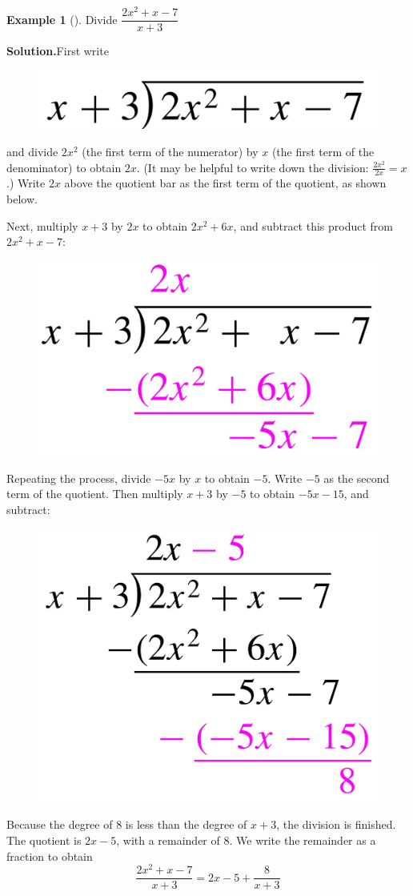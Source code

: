 \documentclass[10pt,]{book}
\theoremstyle{plain}
\theoremstyle{definition}
\theoremstyle{definition}
\newtheorem{example}[theorem]{Example}
\theoremstyle{definition}
\numberwithin{equation}{part}
\begin{document}
\begin{example}[]\label{example-long-division}
Divide \(\dfrac{2x^2+x-7}{x+3}\)%
\par\medskip\noindent%
\textbf{Solution.}\quad First write \leavevmode%
\begin{figure}
\centering
\includegraphics[width=0.35\linewidth]{images/fig-long-division.jpg}
\end{figure}
 and divide \(2x^2\) (the first term of the numerator) by \(x\) (the first term of the denominator) to obtain \(2x\). (It may be helpful to write down the division: \(\frac{2x^2}{2x}=x\).) Write \(2x\) above the quotient bar as the first term of the quotient, as shown below.%
\par
Next, multiply \(x+3\) by \(2x\) to obtain \(2x^2 + 6x\), and subtract this product from \(2x^2 + x − 7\): \leavevmode%
\begin{figure}
\centering
\includegraphics[width=0.35\linewidth]{images/fig-long-division2.jpg}
\end{figure}
%
\par
Repeating the process, divide \(-5x\) by \(x\) to obtain \(-5\). Write \(-5\) as the second term of the quotient. Then multiply \(x+3\) by \(-5\) to obtain \(−5x − 15\), and subtract: \leavevmode%
\begin{figure}
\centering
\includegraphics[width=0.35\linewidth]{images/fig-long-division3.jpg}
\end{figure}
 Because the degree of \(8\) is less than the degree of \(x + 3\), the division is finished. The quotient is \(2x − 5\), with a remainder of \(8\). We write the remainder as a fraction to obtain%
\begin{equation*}
\frac{2x^2 + x − 7}{x + 3}= 2x − 5 + \frac{8}{x + 3}
\end{equation*}
%
\end{example}
\end{document}
